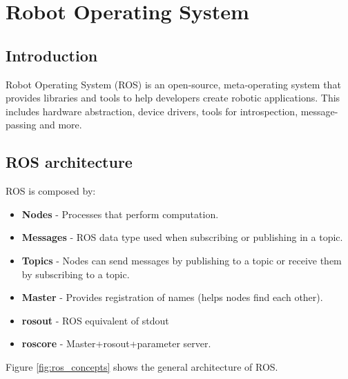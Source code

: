 \documentclass[12pt]{article}
\begin{document}
\section{Robot Operating System}

\subsection{Introduction}
Robot Operating System (ROS) is an open-source, meta-operating system that provides libraries and tools to help developers create robotic applications. This includes hardware abstraction, device drivers, tools for introspection, message-passing and more.
\subsection{ROS architecture}
ROS is composed by:
\begin{itemize}
\item \textbf{Nodes} - Processes that perform computation.
\item \textbf{Messages} - ROS data type used when subscribing or publishing in a topic. 
\item \textbf{Topics} - Nodes can send messages by publishing to a topic or receive them by subscribing to a topic. 
\item \textbf{Master} - Provides registration of names (helps nodes find each other).
\item \textbf{rosout} - ROS equivalent of stdout 
\item \textbf{roscore} - Master+rosout+parameter server. 
\end{itemize}
Figure \ref{fig:ros_concepts} shows the general architecture of ROS.
\end{document}
